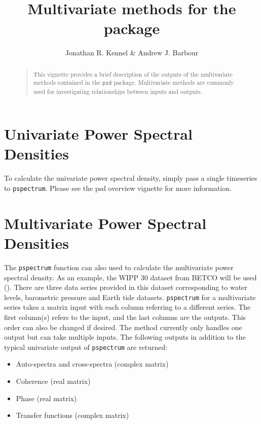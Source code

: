 \documentclass[11pt]{article}\usepackage[]{graphicx}\usepackage[]{color}
\title{Multivariate methods for the \Rcmd{psd} package}
\author{Jonathan R. Kennel & Andrew J. Barbour}
\newcommand{\Rcmd}[1]{\texttt{#1}}
\begin{document}
\maketitle
%
\begin{abstract}
%
\begin{quote}
This vignette provides a brief description of the outputs of the multivariate methods contained in the \Rcmd{psd} package. Multivariate methods are commonly used for investigating relationships between inputs and outputs. 
\end{quote}
%
\end{abstract}

\tableofcontents
\clearpage

\section{Univariate Power Spectral Densities}

To calculate the univariate power spectral density, simply pass a
single timeseries to \Rcmd{pspectrum}. Please see the psd overview vignette for more information.




\section{Multivariate Power Spectral Densities}

The \Rcmd{pspectrum} function can also used to calculate the multivariate power spectral density. 
As an example, the WIPP 30 dataset from BETCO will be used (\citet{Toll2007}). 
There are three data series provided in this dataset corresponding to water levels, 
barometric pressure and Earth tide datasets.  \Rcmd{pspectrum} for a multivariate 
series takes a matrix input with each column referring to a different series. 
The first column(s) refers to the input, and the last columns are the outputs.  
This order can also be changed if desired.  The method currently only handles 
one output but can take multiple inputs.  The following outputs in addition 
to the typical univariate output of \Rcmd{pspectrum} are returned:

\begin{itemize}
\item Auto-spectra and cross-spectra (complex matrix)
\item Coherence (real matrix)
\item Phase (real matrix)
\item Transfer functions (complex matrix)
\end{itemize}
\end{document}
